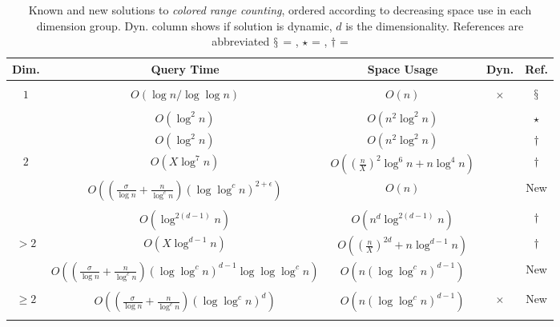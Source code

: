 \begin{table}[t]
    \centering
    \begin{tabular}{c c c c c}
    Dim. & Query Time               & Space Usage                          & Dyn. & Ref.    \\[1mm]
        \hline\\[-3mm]
    $1$        & $O(\log n / \log \log n)$& $O(n)$                             & $\times$ & $\mathsection$ \\[1mm]
    \hline\\[-3mm]
            & $O(\log^2 n)$            & $O(n^2 \log^2 n)$                    & & $\star$  \\
            & $O(\log^2 n)$            & $O(n^2 \log^2 n)$                    & & $\dagger$ \\
    $2$   & $O(X \log^7 n)$          & $O((\frac{n}{X})^2 \log^6 n + n \log^4 n)$ & & $\dagger$ \\
            & $O\left( ( \frac{\sigma}{\log n} + \frac{n}{\log ^c n} ) (\log \log ^c n)^{2+\epsilon} \right)$ & $O(n)$ & & New \\[1mm]
    \hline\\[-3mm]
            & $O(\log^{2(d-1)} n)$     & $O(n^d \log ^{2(d-1)} n)$            & & $\dagger$ \\
    $> 2$  & $O(X \log^{d-1} n)$      & $O((\frac{n}{X})^{2d} + n \log^{d-1} n)$   & & $\dagger$ \\
            & $O\left(( \frac{\sigma}{\log n} + \frac{n}{\log ^c n} ) (\log  \log^{c} n)^{d-1} \log \log \log ^c n\right)$ & $O\!\left(n (\log \log^{c} n)^{d-1} \right)$ & & New \\[1mm]
     \hline\\[-3mm]
    $\geq 2$  & $O\left( ( \frac{\sigma}{\log n} + \frac{n}{\log ^c n} ) (\log \log ^c n)^{d} \right)$ & $O\!\left(n (\log \log^{c} n)^{d-1} \right)$ & $\times$ & New \\[1mm]
        \hline\\[-3mm]
    \end{tabular}
    \caption{Known and new solutions to \emph{colored range counting}, ordered according to decreasing space use in each dimension group. Dyn. column shows if solution is dynamic, $d$ is the dimensionality. References are abbreviated $\mathsection$ = \cite{jaja2005space}, $\star$ = \cite{gupta1995further}, $\dagger$ = \cite{kaplan2007counting}}
 \label{tab:count}
\end{table}


